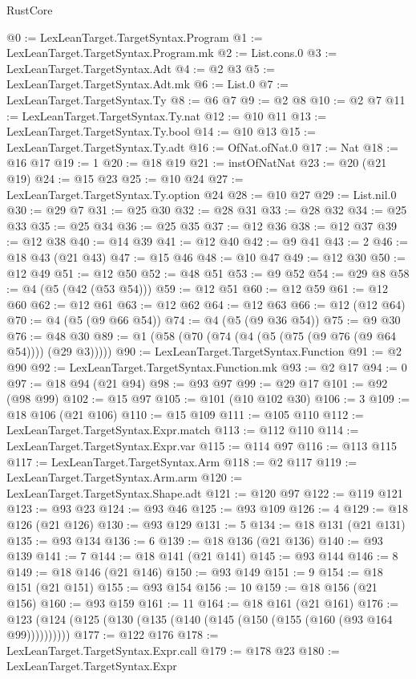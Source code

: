 \begin{lexlean}{RustCore}
\begin{coremodule}
@0 := LexLeanTarget.TargetSyntax.Program
@1 := LexLeanTarget.TargetSyntax.Program.mk
@2 := List.cons.{0}
@3 := LexLeanTarget.TargetSyntax.Adt
@4 := @2 @3
@5 := LexLeanTarget.TargetSyntax.Adt.mk
@6 := List.{0}
@7 := LexLeanTarget.TargetSyntax.Ty
@8 := @6 @7
@9 := @2 @8
@10 := @2 @7
@11 := LexLeanTarget.TargetSyntax.Ty.nat
@12 := @10 @11
@13 := LexLeanTarget.TargetSyntax.Ty.bool
@14 := @10 @13
@15 := LexLeanTarget.TargetSyntax.Ty.adt
@16 := OfNat.ofNat.{0}
@17 := Nat
@18 := @16 @17
@19 := 1
@20 := @18 @19
@21 := instOfNatNat
@23 := @20 (@21 @19)
@24 := @15 @23
@25 := @10 @24
@27 := LexLeanTarget.TargetSyntax.Ty.option @24
@28 := @10 @27
@29 := List.nil.{0}
@30 := @29 @7
@31 := @25 @30
@32 := @28 @31
@33 := @28 @32
@34 := @25 @33
@35 := @25 @34
@36 := @25 @35
@37 := @12 @36
@38 := @12 @37
@39 := @12 @38
@40 := @14 @39
@41 := @12 @40
@42 := @9 @41
@43 := 2
@46 := @18 @43 (@21 @43)
@47 := @15 @46
@48 := @10 @47
@49 := @12 @30
@50 := @12 @49
@51 := @12 @50
@52 := @48 @51
@53 := @9 @52
@54 := @29 @8
@58 := @4 (@5 (@42 (@53 @54)))
@59 := @12 @51
@60 := @12 @59
@61 := @12 @60
@62 := @12 @61
@63 := @12 @62
@64 := @12 @63
@66 := @12 (@12 @64)
@70 := @4 (@5 (@9 @66 @54))
@74 := @4 (@5 (@9 @36 @54))
@75 := @9 @30
@76 := @48 @30
@89 := @1 (@58 (@70 (@74 (@4 (@5 (@75 (@9 @76 (@9 @64 @54)))) (@29 @3)))))
@90 := LexLeanTarget.TargetSyntax.Function
@91 := @2 @90
@92 := LexLeanTarget.TargetSyntax.Function.mk
@93 := @2 @17
@94 := 0
@97 := @18 @94 (@21 @94)
@98 := @93 @97
@99 := @29 @17
@101 := @92 (@98 @99)
@102 := @15 @97
@105 := @101 (@10 @102 @30)
@106 := 3
@109 := @18 @106 (@21 @106)
@110 := @15 @109
@111 := @105 @110
@112 := LexLeanTarget.TargetSyntax.Expr.match
@113 := @112 @110
@114 := LexLeanTarget.TargetSyntax.Expr.var
@115 := @114 @97
@116 := @113 @115
@117 := LexLeanTarget.TargetSyntax.Arm
@118 := @2 @117
@119 := LexLeanTarget.TargetSyntax.Arm.arm
@120 := LexLeanTarget.TargetSyntax.Shape.adt
@121 := @120 @97
@122 := @119 @121
@123 := @93 @23
@124 := @93 @46
@125 := @93 @109
@126 := 4
@129 := @18 @126 (@21 @126)
@130 := @93 @129
@131 := 5
@134 := @18 @131 (@21 @131)
@135 := @93 @134
@136 := 6
@139 := @18 @136 (@21 @136)
@140 := @93 @139
@141 := 7
@144 := @18 @141 (@21 @141)
@145 := @93 @144
@146 := 8
@149 := @18 @146 (@21 @146)
@150 := @93 @149
@151 := 9
@154 := @18 @151 (@21 @151)
@155 := @93 @154
@156 := 10
@159 := @18 @156 (@21 @156)
@160 := @93 @159
@161 := 11
@164 := @18 @161 (@21 @161)
@176 := @123 (@124 (@125 (@130 (@135 (@140 (@145 (@150 (@155 (@160 (@93 @164 @99))))))))))
@177 := @122 @176
@178 := LexLeanTarget.TargetSyntax.Expr.call
@179 := @178 @23
@180 := LexLeanTarget.TargetSyntax.Expr

\end{coremodule}
\end{lexlean}
